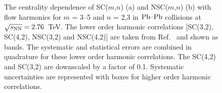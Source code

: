 \begin{figure}[t!]
            \begin{center}
                       \hspace{-0.67cm}
        \caption{The centrality dependence of SC($m$,$n$) (a) and NSC($m$,$n$) (b) with flow harmonics for $m$ = 3--5 and $n$ = 2,3 in $\textnormal{Pb--Pb}$ collisions at $\sqrt{s_{\textnormal{NN}}}=2.76$~TeV. The lower order harmonic correlations [SC(3,2), SC(4,2), NSC(3,2) and NSC(4,2)] are taken from Ref.~\cite{ALICE:2016kpq} and shown as bands. The systematic and statistical errors are combined in quadrature for these lower order harmonic correlations. The SC(4,2) and SC(3,2) are downscaled by a factor of 0.1. Systematic uncertainties are represented with boxes for higher order harmonic correlations.}
        \label{fig:Figure_1}
              \end{center}
\end{figure}

